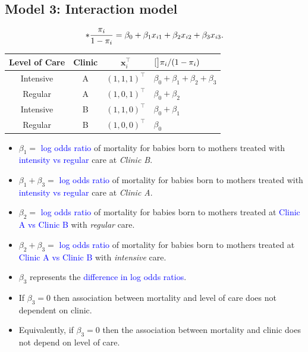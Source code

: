\documentclass{article}\usepackage[]{graphicx}\usepackage[svgnames]{xcolor}
\let\log\relax%
\providecommand{\Vector}[1]{\bm{#1}}%
\begin{document}
\subsection*{Model 3: Interaction model}
\[ \log*{\frac{\pi_i}{1-\pi_i}}=\beta_0+\beta_1x_{i1}+\beta_2x_{i2}+\beta_3x_{i3}. \]
\begin{table}[!htbp]
      \centering
      \begin{tabular}{cccl}
            Level of Care & Clinic & $ \Vector{x}_i^\top $ & $ \log[\big]{\pi_i/(1-\pi_i)} $     \\
            \midrule
            Intensive     & A      & $ (1,1,1)^\top $      & $ \beta_0+\beta_1+\beta_2+\beta_3 $ \\
            Regular       & A      & $ (1,0,1)^\top $      & $ \beta_0+\beta_2 $                 \\
            Intensive     & B      & $ (1,1,0)^\top $      & $ \beta_0+\beta_1 $                 \\
            Regular       & B      & $ (1,0,0)^\top $      & $ \beta_0 $                         \\
            \bottomrule
      \end{tabular}
\end{table}
\begin{itemize}
      \item $ \beta_1= $ \textcolor{Blue}{log odds ratio} of mortality for babies born to mothers treated with
            \textcolor{Blue}{intensity vs regular} care at \emph{Clinic B}.
      \item $ \beta_1+\beta_3= $ \textcolor{Blue}{log odds ratio} of mortality for babies born to mothers treated
            with \textcolor{Blue}{intensity vs regular} care at \emph{Clinic A}.
      \item $ \beta_2= $ \textcolor{Blue}{log odds ratio} of mortality for babies born to mothers treated at
            \textcolor{Blue}{Clinic A vs Clinic B} with \emph{regular} care.
      \item $ \beta_2+\beta_3= $ \textcolor{Blue}{log odds ratio} of mortality for babies born to mothers treated at
            \textcolor{Blue}{Clinic A vs Clinic B} with \emph{intensive} care.
      \item $ \beta_3 $ represents the \textcolor{Blue}{difference in log odds ratios}.
      \item If $ \beta_3=0 $ then association between mortality and level of care does not
            dependent on clinic.
      \item Equivalently, if $ \beta_3=0 $ then the association between mortality and clinic
            does not depend on level of care.
\end{itemize}
\end{document}
